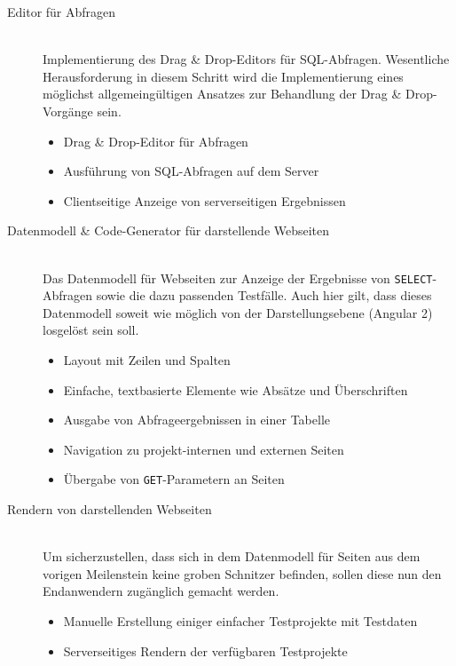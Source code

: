 \begin{description}
\item [Editor für Abfragen] \hfill \\
  Implementierung des Drag \& Drop-Editors für SQL-Abfragen. Wesentliche Heraus\-forderung in diesem Schritt wird die Implementierung eines möglichst allgemeingültigen Ansatzes zur Behandlung der Drag \& Drop-Vorgänge sein.
  \begin{itemize}[noitemsep]
  \item Drag \& Drop-Editor für Abfragen
  \item Ausführung von SQL-Abfragen auf dem Server
  \item Clientseitige Anzeige von serverseitigen Ergebnissen
  \end{itemize}
  
\item [Datenmodell \& Code-Generator für darstellende Webseiten] \hfill \\
  Das Datenmodell für Webseiten zur Anzeige der Ergebnisse von \texttt{SELECT}-Abfragen sowie die dazu passenden Testfälle. Auch hier gilt, dass dieses Datenmodell soweit wie möglich von der Darstellungsebene (Angular 2) losgelöst sein soll.
  \begin{itemize}[noitemsep]
  \item Layout mit Zeilen und Spalten
  \item Einfache, textbasierte Elemente wie Absätze und Überschriften
  \item Ausgabe von Abfrageergebnissen in einer Tabelle
  \item Navigation zu projekt-internen und externen Seiten
  \item Übergabe von \texttt{GET}-Parametern an Seiten
  \end{itemize}
  
\item [Rendern von darstellenden Webseiten] \hfill \\
  Um sicherzustellen, dass sich in dem Datenmodell für Seiten aus dem vorigen Meilenstein keine groben Schnitzer befinden, sollen diese nun den Endanwendern zugänglich gemacht werden.
  \begin{itemize}[noitemsep]
  \item Manuelle Erstellung einiger einfacher Testprojekte mit Testdaten
  \item Serverseitiges Rendern der verfügbaren Testprojekte
  \end{itemize}
  

\end{description}
